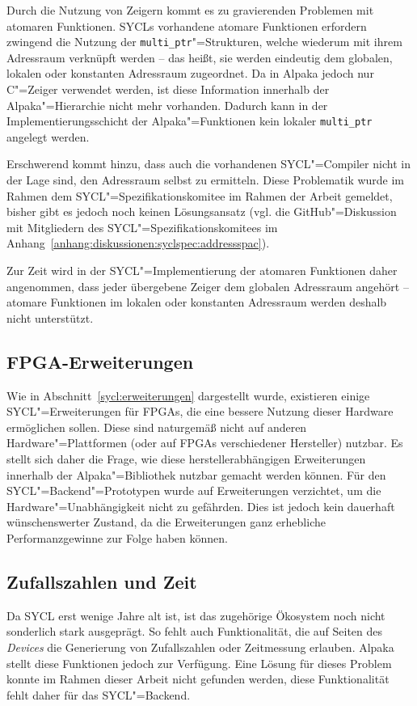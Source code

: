 Durch die Nutzung von Zeigern kommt es zu gravierenden Problemen mit atomaren
Funktionen. SYCLs vorhandene atomare Funktionen erfordern zwingend die Nutzung
der \texttt{multi\_ptr}"=Strukturen, welche wiederum mit ihrem Adressraum
verknüpft werden -- das heißt, sie werden eindeutig dem globalen, lokalen oder
konstanten Adressraum zugeordnet. Da in Alpaka jedoch nur C"=Zeiger
verwendet werden, ist diese Information innerhalb der Alpaka"=Hierarchie nicht
mehr vorhanden. Dadurch kann in der Implementierungsschicht der
Alpaka"=Funktionen kein lokaler \texttt{multi\_ptr} angelegt werden.

Erschwerend kommt hinzu, dass auch die vorhandenen SYCL"=Compiler nicht in der
Lage sind, den Adressraum selbst zu ermitteln. Diese Problematik wurde im Rahmen
dem SYCL"=Spezifikationskomitee im Rahmen der Arbeit gemeldet, bisher gibt es
jedoch noch keinen Lösungsansatz (vgl. die GitHub"=Diskussion mit Mitgliedern
des SYCL"=Spezifikationskomitees im
Anhang~\ref{anhang:diskussionen:syclspec:addressspac}).

Zur Zeit wird in der SYCL"=Implementierung der atomaren Funktionen daher
angenommen, dass jeder übergebene Zeiger dem globalen Adressraum angehört --
atomare Funktionen im lokalen oder konstanten Adressraum werden deshalb nicht
unterstützt.

\subsection{FPGA-Erweiterungen}\label{implementierung:probleme:fpga}

Wie in Abschnitt~\ref{sycl:erweiterungen} dargestellt wurde, existieren einige
SYCL"=Erweiterungen für FPGAs, die eine bessere Nutzung dieser Hardware
ermöglichen sollen. Diese sind naturgemäß nicht auf anderen
Hardware"=Plattformen (oder auf FPGAs verschiedener Hersteller) nutzbar. Es
stellt sich daher die Frage, wie diese herstellerabhängigen Erweiterungen
innerhalb der Alpaka"=Bibliothek nutzbar gemacht werden können. Für den
SYCL"=Backend"=Prototypen wurde auf Erweiterungen verzichtet, um die
Hardware"=Unabhängigkeit nicht zu gefährden. Dies ist jedoch kein dauerhaft
wünschenswerter Zustand, da die Erweiterungen ganz erhebliche Performanzgewinne
zur Folge haben können.

\subsection{Zufallszahlen und Zeit}

Da SYCL erst wenige Jahre alt ist, ist das zugehörige Ökosystem noch nicht
sonderlich stark ausgeprägt. So fehlt auch Funktionalität, die auf Seiten des
\textit{Devices} die Generierung von Zufallszahlen oder Zeitmessung erlauben.
Alpaka stellt diese Funktionen jedoch zur Verfügung. Eine Lösung für dieses
Problem konnte im Rahmen dieser Arbeit nicht gefunden werden, diese
Funktionalität fehlt daher für das SYCL"=Backend.

